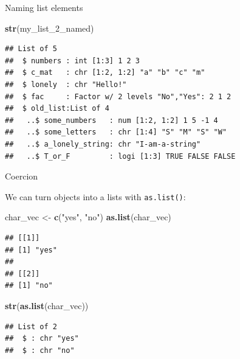 \documentclass[ignorenonframetext,]{beamer}
\newenvironment{Shaded}{\begin{snugshade}}{\end{snugshade}}
\newcommand{\DecValTok}[1]{\textcolor[rgb]{0.00,0.00,0.81}{#1}}
\newcommand{\KeywordTok}[1]{\textcolor[rgb]{0.13,0.29,0.53}{\textbf{#1}}}
\newcommand{\NormalTok}[1]{#1}
\newcommand{\StringTok}[1]{\textcolor[rgb]{0.31,0.60,0.02}{#1}}
\begin{document}
\begin{frame}[fragile]{Naming list elements}
\protect\hypertarget{naming-list-elements-6}{}

\begin{Shaded}
\begin{Highlighting}[]
\KeywordTok{str}\NormalTok{(my_list_}\DecValTok{2}\NormalTok{_named)}
\end{Highlighting}
\end{Shaded}

\begin{verbatim}
## List of 5
##  $ numbers : int [1:3] 1 2 3
##  $ c_mat   : chr [1:2, 1:2] "a" "b" "c" "m"
##  $ lonely  : chr "Hello!"
##  $ fac     : Factor w/ 2 levels "No","Yes": 2 1 2
##  $ old_list:List of 4
##   ..$ some_numbers   : num [1:2, 1:2] 1 5 -1 4
##   ..$ some_letters   : chr [1:4] "S" "M" "S" "W"
##   ..$ a_lonely_string: chr "I-am-a-string"
##   ..$ T_or_F         : logi [1:3] TRUE FALSE FALSE
\end{verbatim}

\end{frame}

\begin{frame}[fragile]{Coercion}
\protect\hypertarget{coercion}{}

We can turn objects into a lists with \texttt{as.list()}:

\begin{Shaded}
\begin{Highlighting}[]
\NormalTok{char_vec <-}\StringTok{ }\KeywordTok{c}\NormalTok{(}\StringTok{"yes"}\NormalTok{, }\StringTok{"no"}\NormalTok{)}
\KeywordTok{as.list}\NormalTok{(char_vec)}
\end{Highlighting}
\end{Shaded}

\begin{verbatim}
## [[1]]
## [1] "yes"
## 
## [[2]]
## [1] "no"
\end{verbatim}

\begin{Shaded}
\begin{Highlighting}[]
\KeywordTok{str}\NormalTok{(}\KeywordTok{as.list}\NormalTok{(char_vec))}
\end{Highlighting}
\end{Shaded}

\begin{verbatim}
## List of 2
##  $ : chr "yes"
##  $ : chr "no"
\end{verbatim}

\end{frame}
\end{document}

